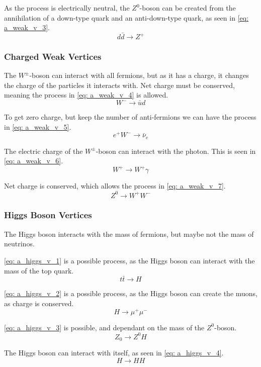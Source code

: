 As the process is electrically neutral, the $Z^{0}$-boson can be created from the annihilation of a down-type quark and an anti-down-type quark, as seen in \cref{eq: a_weak_v_3}.
\begin{equation}\label{eq: a_weak_v_3}
  d \bar{d} → Z^{+}  
\end{equation}

\subsubsection{Charged Weak Vertices}
The $W^{±}$-boson can interact with all fermions, but as it has a charge, it changes the charge of the particles it interacts with. Net charge must be conserved, meaning the process in \cref{eq: a_weak_v_4} is allowed.
\begin{equation}\label{eq: a_weak_v_4}
  W^{-} → \bar{u} d
\end{equation}

To get zero charge, but keep the number of anti-fermions we can have the process in \cref{eq: a_weak_v_5}.
\begin{equation}\label{eq: a_weak_v_5}
  e^{+}W^{-} → \bar{ν}_{e}
\end{equation}

The electric charge of the $W^{±}$-boson can interact with the photon. This is seen in \cref{eq: a_weak_v_6}.
\begin{equation}\label{eq: a_weak_v_6}
  W^{+} → W^{+}γ
\end{equation}

Net charge is conserved, which allows the process in \cref{eq: a_weak_v_7}.
\begin{equation}\label{eq: a_weak_v_7}
  Z^{0} → W^{+}W^{-}  
\end{equation}

\subsubsection{Higgs Boson Vertices}
The Higgs boson interacts with the mass of fermions, but maybe not the mass of neutrinos. 

\cref{eq: a_higgs_v_1} is a possible process, as the Higgs boson can interact with the mass of the top quark.
\begin{equation}\label{eq: a_higgs_v_1}
  t \bar{t} → H
\end{equation}

\cref{eq: a_higgs_v_2} is a possible process, as the Higgs boson can create the muons, as charge is conserved. 
\begin{equation}\label{eq: a_higgs_v_2}
  H → μ^{+} μ^{-}
\end{equation}

\cref{eq: a_higgs_v_3} is possible, and dependant on the mass of the $Z^{0}$-boson.
\begin{equation}\label{eq: a_higgs_v_3}
Z_0 → Z^{0}H  
\end{equation}

The Higgs boson can interact with itself, as seen in \cref{eq: a_higgs_v_4}.
\begin{equation}\label{eq: a_higgs_v_4}
H → H H
\end{equation} 



